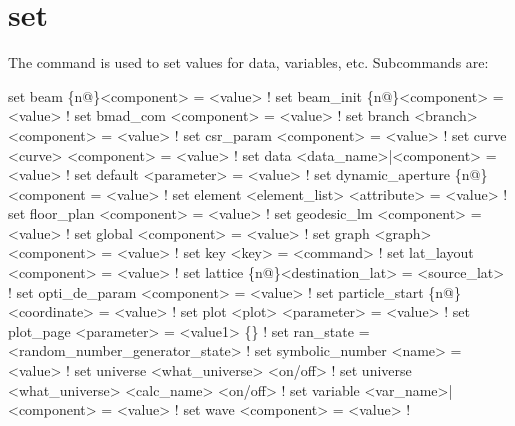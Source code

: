{{%
\section{set}
\label{s:set}

The  command is used to set values for data, variables, etc. Subcommands are:
\begin{example}
  set beam \{n@\}<component> = <value>                        ! 
  set beam_init \{n@\}<component> = <value>                   ! 
  set bmad_com <component> = <value>                        ! 
  set branch <branch> <component> = <value>                 ! 
  set csr_param <component> = <value>                       ! 
  set curve <curve> <component> = <value>                   ! 
  set data <data_name>|<component> = <value>                ! 
  set default <parameter> = <value>                         ! 
  set dynamic_aperture \{n@\}<component = <value>             ! 
  set element <element_list> <attribute> = <value>          ! 
  set floor_plan <component> = <value>                      ! 
  set geodesic_lm <component> = <value>                     ! 
  set global <component> = <value>                          ! 
  set graph <graph> <component> = <value>                   ! 
  set key <key> = <command>                                 ! 
  set lat_layout <component> = <value>                      ! 
  set lattice \{n@\}<destination_lat> = <source_lat>          ! 
  set opti_de_param <component> = <value>                   ! 
  set particle_start \{n@\}<coordinate> = <value>             ! 
  set plot <plot> <parameter> = <value>                     ! 
  set plot_page <parameter> = <value1> \{<value2>\}           ! 
  set ran_state = <random_number_generator_state>           ! 
  set symbolic_number <name> = <value>                      ! 
  set universe <what_universe> <on/off>                     ! 
  set universe <what_universe> <calc_name> <on/off>         ! 
  set variable <var_name>|<component> = <value>             ! 
  set wave <component> = <value>                            ! 
\end{example}

}}
